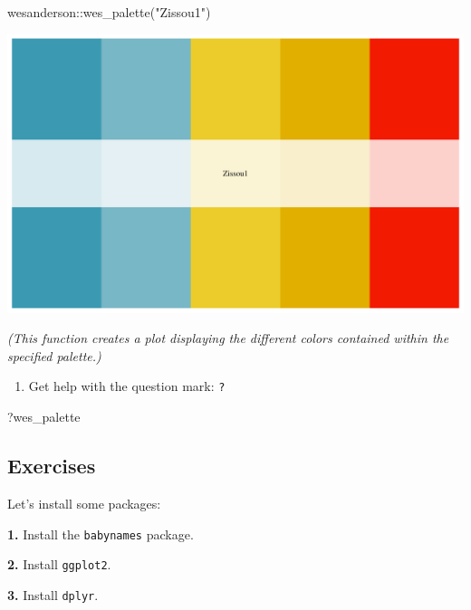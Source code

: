 \documentclass[
]{book}
\newenvironment{Shaded}{\begin{snugshade}}{\end{snugshade}}
\newcommand{\FunctionTok}[1]{\textcolor[rgb]{0.00,0.00,0.00}{#1}}
\newcommand{\NormalTok}[1]{#1}
\newcommand{\SpecialCharTok}[1]{\textcolor[rgb]{0.00,0.00,0.00}{#1}}
\newcommand{\StringTok}[1]{\textcolor[rgb]{0.31,0.60,0.02}{#1}}
\providecommand{\tightlist}{%
  \setlength{\itemsep}{0pt}\setlength{\parskip}{0pt}}
\begin{document}
\begin{Shaded}
\begin{Highlighting}[]
\NormalTok{wesanderson}\SpecialCharTok{::}\FunctionTok{wes\_palette}\NormalTok{(}\StringTok{"Zissou1"}\NormalTok{)}
\end{Highlighting}
\end{Shaded}

\includegraphics{figures/unnamed-chunk-135-2.pdf}

\emph{(This function creates a plot displaying the different colors contained within the specified palette.)}

\begin{enumerate}
\def\labelenumi{\arabic{enumi}.}
\setcounter{enumi}{3}
\tightlist
\item
  Get help with the question mark: \texttt{?}
\end{enumerate}

\begin{Shaded}
\begin{Highlighting}[]
\NormalTok{?wes\_palette}
\end{Highlighting}
\end{Shaded}

\hypertarget{exercises-4}{%
\subsection*{Exercises}\label{exercises-4}}

Let's install some packages:

\textbf{1.} Install the \texttt{babynames} package.

\textbf{2.} Install \texttt{ggplot2}.

\textbf{3.} Install \texttt{dplyr}.
\end{document}
